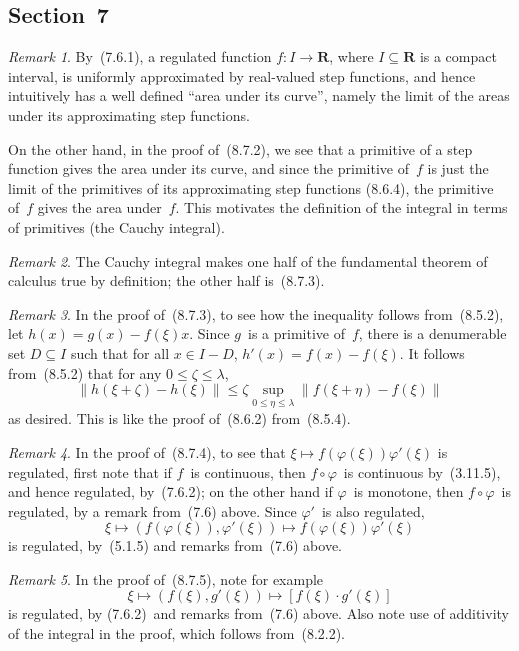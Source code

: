 \documentclass[letterpaper,12pt]{article}
\newcommand{\R}{\mathbf{R}}
\newcommand{\after}{\circ}
\newcommand{\norm}[1]{\lVert{#1}\rVert}
\newcommand{\cbprod}[2]{[{#1}\cdot{#2}]}
\theoremstyle{plain}
\theoremstyle{definition}
\theoremstyle{remark}
\newtheorem*{rmk}{Remark}
\begin{document}
\subsection*{Section~7}
\begin{rmk}
By~(7.6.1), a regulated function \(f:I\to\R\), where \(I\subseteq\R\) is a compact interval, is uniformly approximated by real-valued step functions, and hence intuitively has a well defined ``area under its curve'', namely the limit of the areas under its approximating step functions.

On the other hand, in the proof of~(8.7.2), we see that a primitive of a step function gives the area under its curve, and since the primitive of~\(f\) is just the limit of the primitives of its approximating step functions (8.6.4), the primitive of~\(f\) gives the area under~\(f\). This motivates the definition of the integral in terms of primitives (the Cauchy integral).
\end{rmk}

\begin{rmk}
The Cauchy integral makes one half of the fundamental theorem of calculus true by definition; the other half is~(8.7.3).
\end{rmk}

\begin{rmk}
In the proof of~(8.7.3), to see how the inequality follows from~(8.5.2), let \(h(x)=g(x)-f(\xi)x\). Since \(g\)~is a primitive of~\(f\), there is a denumerable set \(D\subseteq I\) such that for all \(x\in I-D\), \(h'(x)=f(x)-f(\xi)\). It follows from~(8.5.2) that for any \(0\le\zeta\le\lambda\),
\[\norm{h(\xi+\zeta)-h(\xi)}\le\zeta\sup_{0\le\eta\le\lambda}\norm{f(\xi+\eta)-f(\xi)}\]
as desired. This is like the proof of~(8.6.2) from~(8.5.4).
\end{rmk}

\begin{rmk}
In the proof of~(8.7.4), to see that \(\xi\mapsto f(\varphi(\xi))\varphi'(\xi)\) is regulated, first note that if \(f\)~is continuous, then \(f\after\varphi\)~is continuous by~(3.11.5), and hence regulated, by~(7.6.2); on the other hand if \(\varphi\)~is monotone, then \(f\after\varphi\)~is regulated, by a remark from~(7.6) above. Since \(\varphi'\)~is also regulated,
\[\xi\mapsto(f(\varphi(\xi)),\varphi'(\xi))\mapsto f(\varphi(\xi))\varphi'(\xi)\]
is regulated, by~(5.1.5) and remarks from~(7.6) above.
\end{rmk}

\begin{rmk}
In the proof of~(8.7.5), note for example
\[\xi\mapsto(f(\xi),g'(\xi))\mapsto\cbprod{f(\xi)}{g'(\xi)}\]
is regulated, by (7.6.2)~and remarks from~(7.6) above. Also note use of additivity of the integral in the proof, which follows from~(8.2.2).
\end{rmk}
\end{document}
